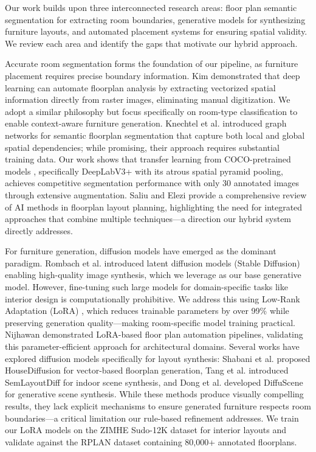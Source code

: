 \documentclass[10pt,conference]{IEEEtran}
\begin{document}
Our work builds upon three interconnected research areas: floor plan semantic segmentation for extracting room boundaries, generative models for synthesizing furniture layouts, and automated placement systems for ensuring spatial validity. We review each area and identify the gaps that motivate our hybrid approach. 

Accurate room segmentation forms the foundation of our pipeline, as furniture placement requires precise boundary information. Kim \cite{b1} demonstrated that deep learning can automate floorplan analysis by extracting vectorized spatial information directly from raster images, eliminating manual digitization. We adopt a similar philosophy but focus specifically on room-type classification to enable context-aware furniture generation. Knechtel et al. \cite{b2} introduced graph networks for semantic floorplan segmentation that capture both local and global spatial dependencies; while promising, their approach requires substantial training data. Our work shows that transfer learning from COCO-pretrained models \cite{b3}, specifically DeepLabV3+ with its atrous spatial pyramid pooling, achieves competitive segmentation performance with only 30 annotated images through extensive augmentation. Saliu and Elezi \cite{b4} provide a comprehensive review of AI methods in floorplan layout planning, highlighting the need for integrated approaches that combine multiple techniques---a direction our hybrid system directly addresses.

For furniture generation, diffusion models have emerged as the dominant paradigm. Rombach et al. \cite{b5} introduced latent diffusion models (Stable Diffusion) enabling high-quality image synthesis, which we leverage as our base generative model. However, fine-tuning such large models for domain-specific tasks like interior design is computationally prohibitive. We address this using Low-Rank Adaptation (LoRA) \cite{b6}, which reduces trainable parameters by over 99\% while preserving generation quality---making room-specific model training practical. Nijhawan \cite{b7} demonstrated LoRA-based floor plan automation pipelines, validating this parameter-efficient approach for architectural domains. Several works have explored diffusion models specifically for layout synthesis: Shabani et al. \cite{b8} proposed HouseDiffusion for vector-based floorplan generation, Tang et al. \cite{b9} introduced SemLayoutDiff for indoor scene synthesis, and Dong et al. \cite{b10} developed DiffuScene for generative scene synthesis. While these methods produce visually compelling results, they lack explicit mechanisms to ensure generated furniture respects room boundaries---a critical limitation our rule-based refinement addresses. We train our LoRA models on the ZIMHE Sudo-12K dataset \cite{b11} for interior layouts and validate against the RPLAN dataset \cite{b12} containing 80,000+ annotated floorplans.
\end{document}
